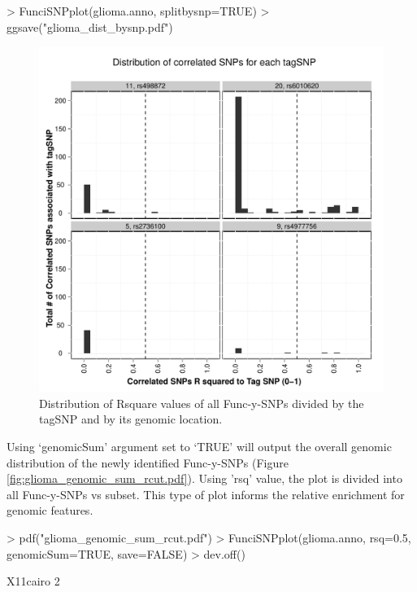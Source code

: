 \documentclass[12pt,fullpage]{article}
\begin{document}
\begin{Schunk}
\begin{Sinput}
> FunciSNPplot(glioma.anno, splitbysnp=TRUE)
> ggsave("glioma_dist_bysnp.pdf")
\end{Sinput}
\end{Schunk}

\begin{figure}[ht!]
\begin{center}
\includegraphics{glioma_dist_bysnp.pdf}
\caption{\label{fig:glioma_dist_bysnp.pdf} Distribution of Rsquare values of all
 Func-y-SNPs divided by the tagSNP and by its genomic location.}
{\footnotesize{}}
\end{center}
\end{figure}

Using `genomicSum' argument set to `TRUE' will output the overall genomic
distribution of the newly identified Func-y-SNPs (Figure
\ref{fig:glioma_genomic_sum_rcut.pdf}).  Using 'rsq' value, the plot is divided
into all Func-y-SNPs vs subset. This type of plot informs the relative
enrichment for genomic features.

\begin{Schunk}
\begin{Sinput}
> pdf("glioma_genomic_sum_rcut.pdf")
> FunciSNPplot(glioma.anno, rsq=0.5, genomicSum=TRUE, save=FALSE)
> dev.off()
\end{Sinput}
\begin{Soutput}
X11cairo 
       2 
\end{Soutput}
\end{Schunk}
\end{document}
